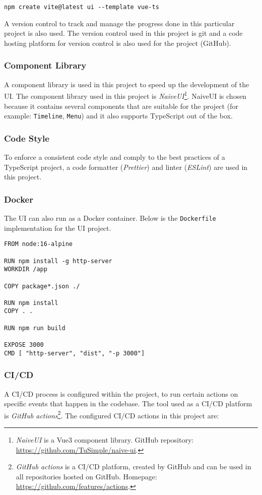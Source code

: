   \begin{lstlisting}[caption={Creating a new Vite project (Shell)}]
 npm create vite@latest ui --template vue-ts
  \end{lstlisting}

  A version control to track and manage the progress done in this particular project is also used. The version control used in this project is git and a code hosting platform for version control is also used for the project (GitHub).

  \subsubsection{Component Library}
  A component library is used in this project to speed up the development of the UI. The component library used in this project is \emph{NaiveUI}\footnote{\emph{NaiveUI} is a Vue3 component library. GitHub repository: \url{https://github.com/TuSimple/naive-ui}.}. NaiveUI is chosen because it contains several components that are suitable for the project (for example: \verb;Timeline;, \verb;Menu;) and it also supports TypeScript out of the box.

  \subsubsection{Code Style}
  To enforce a consistent code style and comply to the best practices of a TypeScript project, a code formatter (\emph{Prettier}) and linter (\emph{ESLint}) are used in this project. 

  \subsubsection{Docker}
  The UI can also run as a Docker container. Below is the \verb;Dockerfile; implementation for the UI project. 

  \begin{lstlisting}[caption={Dockerfile for FDS (Docker)}, language=docker]
FROM node:16-alpine

RUN npm install -g http-server
WORKDIR /app

COPY package*.json ./

RUN npm install
COPY . .

RUN npm run build

EXPOSE 3000
CMD [ "http-server", "dist", "-p 3000"]
      \end{lstlisting}

  \subsubsection{CI/CD}
  A CI/CD process is configured within the project, to run certain actions on specific events that happen in the codebase. The tool used as a CI/CD platform is \emph{GitHub actions}\footnote{\emph{GitHub actions} is a CI/CD platform, created by GitHub and can be used in all repositories hosted on GitHub. Homepage: \url{https://github.com/features/actions}.}. The configured CI/CD actions in this project are:

